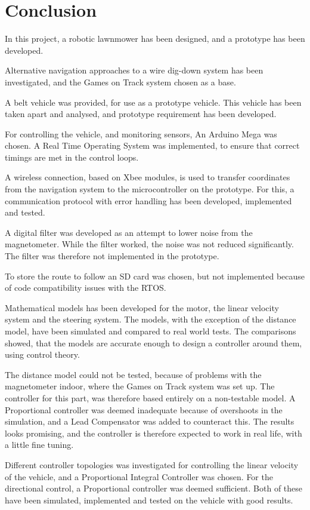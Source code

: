 \chapter{Conclusion}\label{cha:conclusion}
In this project, a robotic lawnmower has been designed, and a prototype has been developed.

Alternative navigation approaches to a wire dig-down system has been investigated, and the Games on Track system chosen as a base. 

A belt vehicle was provided, for use as a prototype vehicle. This vehicle has been taken apart and analysed, and prototype requirement has been developed.

For controlling the vehicle, and monitoring sensors, An Arduino Mega was chosen. A Real Time Operating System was implemented, to ensure that correct timings are met in the control loops.  

A wireless connection, based on Xbee modules, is used to transfer coordinates from the navigation system to the microcontroller on the prototype. For this, a communication protocol with error handling has been developed, implemented and tested.

A digital filter was developed as an attempt to lower noise from the magnetometer. While the filter worked, the noise was not reduced significantly. The filter was therefore not implemented in the prototype.

To store the route to follow an SD card was chosen, but not implemented because of code compatibility issues with the RTOS.

Mathematical models has been developed for the motor, the linear velocity system and the steering system. The models, with the exception of the distance model, have been simulated and compared to real world tests. The comparisons showed, that the models are accurate enough to design a controller around them, using control theory.

The distance model could not be tested, because of problems with the magnetometer indoor, where the Games on Track system was set up. The controller for this part, was therefore based entirely on a non-testable model. A Proportional controller was deemed inadequate because of overshoots in the simulation, and a Lead Compensator was added to counteract this. The results looks promising, and the controller is therefore expected to work in real life, with a little fine tuning.
	
Different controller topologies was investigated for controlling the linear velocity of the vehicle, and a Proportional Integral Controller was chosen. For the directional control, a Proportional controller was deemed sufficient. Both of these have been simulated, implemented and tested on the vehicle with good results.
 